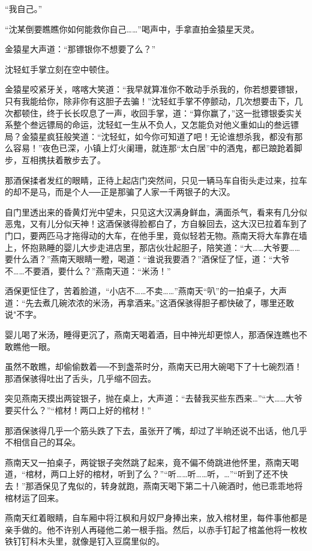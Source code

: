 \documentclass[12pt,oneside]{book}
\begin{document}
``我自己。''

``沈某倒要瞧瞧你如何能救你自己\ldots\ldots{}''喝声中，手拿直拍金猿星天灵。

金猿星大声道：``那镖银你不想要了么？''

沈轻虹手掌立刻在空中顿住。

金猿星咬紧牙关，喀喀大笑道：``我早就算准你不敢动手杀我的，你若想要镖银，只有我能给你，除非你有这胆子去骗！''沈轻虹手掌不停颤动，几次想要击下，几次都顿住，终于长长叹息了一声，收回手掌，道：``算你赢了，''这一批镖银委实关系整个叁远镖局的命运，沈轻虹一生从不负人，又怎能负对他义重如山的叁远镖局？金猿星疯狂般笑道：``沈轻虹，如今你可知道了吧！无论谁想杀我，都没有那么容易！''夜色已深，小镇上灯火阑珊，就连那``太白居''中的酒鬼，都已踉跄着脚步，互相携扶着散步去了。

那酒保揉者发红的眼睛，正待上起店门突然间，只见一辆马车自街头走过来，拉车的却不是马，而是个人──正是那骗了人家一千两银子的大汉。

自门里透出来的昏黄灯光中望未，只见这大汉满身鲜血，满面杀气，看来有几分似恶鬼，又有儿分似天神！这酒保骇得脸都白了，方自躲回去，这大汉已拉着车到了门口，要两匹马才拖得动的大车，在他手里，竟似轻若无物。燕南天将大车靠在墙上，怀抱熟睡的婴儿大步走进店里，那店伙壮起胆子，陪笑道：``大\ldots\ldots 大爷要\ldots\ldots 要什么酒？''燕南天眼睛一瞪，喝道：``谁说我要酒？''酒保怔了怔，道：``大爷不\ldots\ldots 不要酒，要什么？''燕南天道：``米汤！''

酒保更怔住了，苦着脸道，``小店不\ldots\ldots 不卖\ldots\ldots{}''燕南天``叭''的一拍桌子，大声道：``先去煮几碗浓浓的米汤，再拿酒来。''这酒保骇得胆子都快破了，哪里还敢说"不字。

婴儿喝了米汤，睡得更沉了，燕南天喝着酒，目中神光却更惊人，那酒保连瞧也不敢瞧他一眼。

虽然不敢瞧，却偷偷数着──不到盏茶时分，燕南天已用大碗喝下了十七碗烈酒！那酒保骇得吐出了舌头，几乎缩不回去。

突见燕南天摸出两锭银子，抛在桌上，大声道：``去替我买些东西来\ldots{}''``大\ldots\ldots 大爷要买什么？''``棺材！两口上好的棺材！''

那酒保骇得几乎一个筋头跌了下去，虽张开了嘴，却过了半晌还说不出话，他几乎不相信自己的耳朵。

燕南天又一拍桌子，两锭银子突然跳了起来，竟不偏不倚跳进他怀里，燕南天喝道，``棺材，两口上好的棺材，听到了么？''``听\ldots\ldots 听\ldots\ldots 听，\ldots{}''``听到了还不快去！''那酒保见了鬼似的，转身就跑，燕南天喝下第二十八碗酒时，他已乖乖地将棺材运了回来。

燕南天红着眼睛，自车厢中将江枫和月奴尸身捧出来，放入棺材里，每件事他都是亲手做的。他不许别人再碰他二弟一根手指。然后，以赤手钉起了棺盖他将一枚枚铁钉钉科木头里，就像是钉入豆腐里似的。
\end{document}
